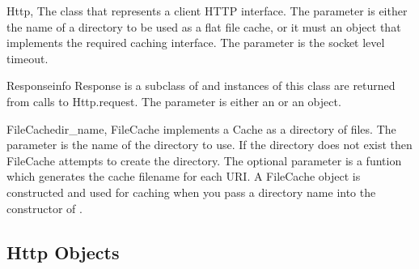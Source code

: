 %

\begin{classdesc}{Http}{, }
The class that represents a client HTTP interface.
The  parameter is either the name of a directory
to be used as a flat file cache, or it must an object that 
implements the required caching interface.
The  parameter is the socket level timeout.
\end{classdesc}

\begin{classdesc}{Response}{info}
Response is a subclass of  and instances of this 
class are returned from calls
to Http.request. The  parameter is either 
an  or an  object.
\end{classdesc}

\begin{classdesc}{FileCache}{dir_name, }
FileCache implements a Cache as a directory of files.
The  parameter is
the name of the directory to use. If the directory does
not exist then FileCache attempts to create the directory.
The optional  parameter is a funtion which generates
the cache filename for each URI. A FileCache object is 
constructed and used for caching when you pass a directory name
into the constructor of .
\end{classdesc}



\subsection{Http Objects}
\label{http-objects}

